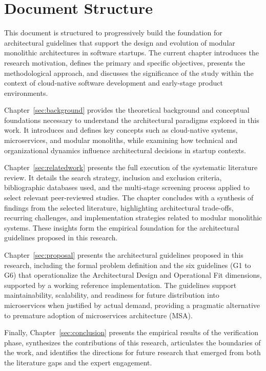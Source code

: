 \pagebreak
\section{Document Structure}

This document is structured to progressively build the foundation for architectural guidelines that support the design and evolution of modular monolithic architectures in software startups. The current chapter introduces the research motivation, defines the primary and specific objectives, presents the methodological approach, and discusses the significance of the study within the context of cloud-native software development and early-stage product environments.

Chapter~\ref{sec:background} provides the theoretical background and conceptual foundations necessary to understand the architectural paradigms explored in this work. It introduces and defines key concepts such as cloud-native systems, microservices, and modular monoliths, while examining how technical and organizational dynamics influence architectural decisions in startup contexts.

Chapter~\ref{sec:relatedwork} presents the full execution of the systematic literature review. It details the search strategy, inclusion and exclusion criteria, bibliographic databases used, and the multi-stage screening process applied to select relevant peer-reviewed studies. The chapter concludes with a synthesis of findings from the selected literature, highlighting architectural trade-offs, recurring challenges, and implementation strategies related to modular monolithic systems. These insights form the empirical foundation for the architectural guidelines proposed in this research.

Chapter~\ref{sec:proposal} presents the architectural guidelines proposed in this research, including the formal problem definition and the six guidelines (G1 to G6) that operationalize the Architectural Design and Operational Fit dimensions, supported by a working reference implementation. The guidelines support maintainability, scalability, and readiness for future distribution into microservices when justified by actual demand, providing a pragmatic alternative to premature adoption of microservices architecture (MSA).

Finally, Chapter~\ref{sec:conclusion} presents the empirical results of the verification phase, synthesizes the contributions of this research, articulates the boundaries of the work, and identifies the directions for future research that emerged from both the literature gaps and the expert engagement.
